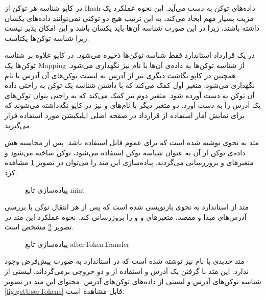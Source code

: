 در کاپو شناسه هر توکن از
\gls{Hash}
داده‌های توکن به دست می‌آید.
این نحوه عملکرد یک مزیت بسیار مهم ایجاد می‌کند،
به این ترتیب هیچ دو توکنی نمی‌توانند داده‌های یکسان داشته باشند،
زیرا در این صورت شناسه آن‌ها باید یکسان باشد و این امکان پذیر نیست زیرا شناسه توکن‌ها یکتاست.

در یک قرارداد
استاندارد فقط شناسه توکن‌ها ذخیره می‌شود. در کاپو علاوه بر شناسه توکن‌ها یک
\gls{Mapping}
از شناسه توکن‌ها به داده‌ی آن‌ها با نام
نیز نگهداری می‌شود. همچنین در کاپو نگاشت دیگری نیز از آدرس به لیست توکن‌های آن آدرس با نام
نگهداری می‌شود.
متغیر اول کمک می‌کند که با داشتن شناسه یک توکن به راحتی داده آن توکن به دست آورده شود.
متغیر دوم نیز کمک می‌کند که به راحتی بتوان توکن‌های یک آدرس را به دست آورد. دو متغیر دیگر با نام‌های
و
نیز در کاپو نگه‌داشته می‌شوند که برای نمایش آمار استفاده از قرارداد در صفحه اصلی اپلیکیشن مورد استفاده قرار می‌گیرند.

متد
به نحوی نوشته شده است که برای عموم قابل استفاده باشد.
پس از محاسبه هش داده‌ی توکن از آن به عنوان شناسه توکن استفاده می‌شود،
توکن ساخته می‌شود و متغیرهای
و
بروزرسانی می‌گردند.
پیاده‌سازی این متد را می‌توان در تصویر
\ref{fig:mint}
مشاهده کرد.

\begin{figure}
\centerline{}
\caption{پیاده‌سازی تابع mint}
\label{fig:mint}
\end{figure}

متد
از استاندارد
به نحوی بازنویسی
شده است که پس از هر انتقال توکن با بررسی آدرس‌های مبدا و مقصد، متغیر‌های
و
و
را بروزرسانی کند.
نحوه عملکرد این متد در تصویر
\ref{fig:afterTokenTransfer}
مشخص است.

\begin{figure}
\centerline{}
\caption{پیاده‌سازی تابع afterTokenTransfer}
\label{fig:afterTokenTransfer}
\end{figure}

متد جدیدی با نام
نیز نوشته شده است که در استاندارد
به صورت پیش‌فرض وجود ندارد. این متد با گرفتن یک آدرس و استفاده از
و
دو خروجی برمی‌گرداند، لیستی از شناسه توکن‌های آدرس و لیستی از داده‌های توکن‌های آدرس.
محتوای این متد در تصویر
\ref{fig:getUserTokens}
قابل مشاهده است.

